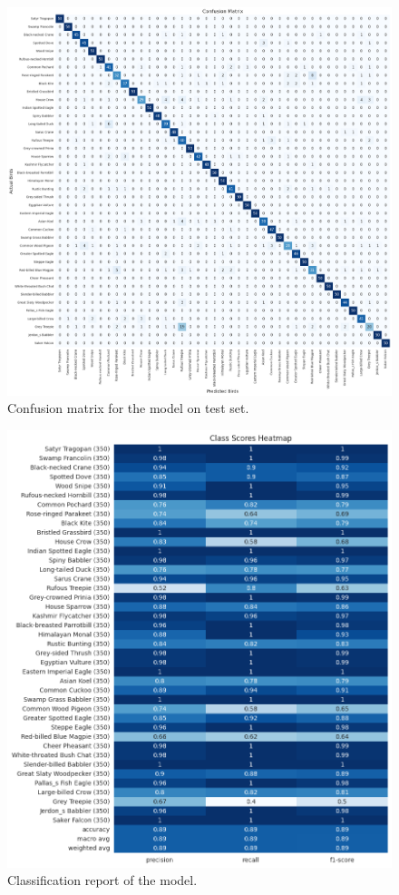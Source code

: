 \begin{figure}[h!]
    \centering
    \includegraphics[scale=0.3]{images/confusion_matrix.png}
    \caption{Confusion matrix for the model on test set.}
    \label{fig:Confusion matrix}
\end{figure}

\begin{figure}[h!]
    \centering
    \includegraphics[scale=0.45]{images/classification_report.png}
    \caption{Classification report of the model.}
    \label{fig:Classification report}
\end{figure}

